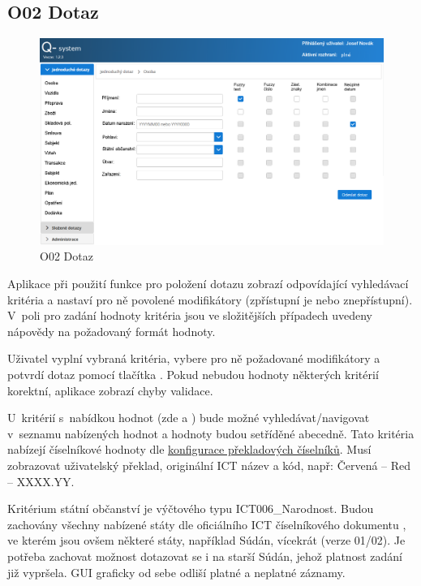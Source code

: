 \documentclass[thesis=M,czech]{FITthesis}[2019/12/23]
\begin{document}
\subsection{O02 Dotaz}
\label{O02Dotaz}
\begin{figure}[H]
  \centering
  \includegraphics[width=\textwidth]{res/screens/O02 Dotaz.png}
  \caption{O02 Dotaz}
  \label{fig:O02 Dotaz}
\end{figure}

Aplikace při použití funkce pro položení dotazu zobrazí odpovídající vyhledávací kritéria a nastaví pro ně povolené modifikátory (zpřístupní je nebo znepřístupní). V~poli pro zadání hodnoty kritéria jsou ve složitějších případech uvedeny nápovědy na požadovaný formát hodnoty.

Uživatel vyplní vybraná kritéria, vybere pro ně požadované modifikátory a potvrdí dotaz pomocí tlačítka . Pokud nebudou hodnoty některých kritérií korektní, aplikace zobrazí chyby validace.

U~kritérií s~nabídkou hodnot (zde  a ) bude možné vyhledávat\slash navigovat v~seznamu nabízených hodnot a hodnoty budou setříděné abecedně. Tato kritéria nabízejí číselníkové hodnoty dle \hyperref[Logy]{konfigurace překladových číselníků}. Musí zobrazovat uživatelský překlad, originální ICT název a kód, např: Červená -- Red -- XXXX.YY.

Kritérium státní občanství je výčtového typu ICT006\_Narodnost. Budou zachovány všechny nabízené státy dle oficiálního ICT číselníkového dokumentu \cite{ICT}, ve kterém jsou ovšem některé státy, například Súdán, vícekrát (verze 01\slash02). Je potřeba zachovat možnost dotazovat se i na starší Súdán, jehož platnost zadání již vypršela. GUI graficky od sebe odliší platné a neplatné záznamy.
\end{document}
